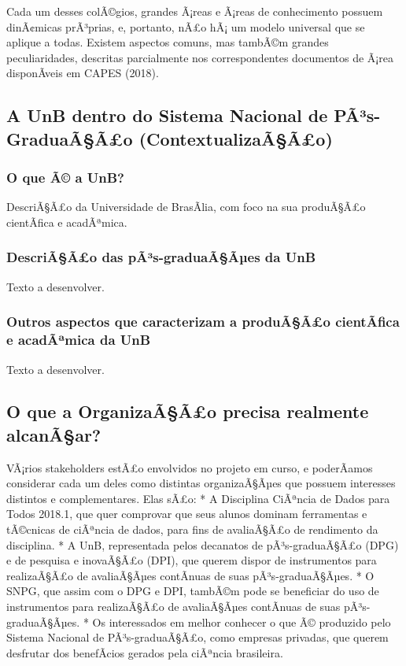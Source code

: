 \documentclass[]{article}
\begin{document}
Cada um desses colÃ©gios, grandes Ã¡reas e Ã¡reas de conhecimento
possuem dinÃ¢micas prÃ³prias, e, portanto, nÃ£o hÃ¡ um modelo universal
que se aplique a todas. Existem aspectos comuns, mas tambÃ©m grandes
peculiaridades, descritas parcialmente nos correspondentes documentos de
Ã¡rea disponÃ­veis em CAPES (2018).

\subsection{A UnB dentro do Sistema Nacional de PÃ³s-GraduaÃ§Ã£o
(ContextualizaÃ§Ã£o)}\label{a-unb-dentro-do-sistema-nacional-de-pas-graduaaao-contextualizaaao}

\subsubsection{O que Ã© a UnB?}\label{o-que-a-a-unb}

DescriÃ§Ã£o da Universidade de BrasÃ­lia, com foco na sua produÃ§Ã£o
cientÃ­fica e acadÃªmica.

\subsubsection{DescriÃ§Ã£o das pÃ³s-graduaÃ§Ãµes da
UnB}\label{descriaao-das-pas-graduaaaes-da-unb}

Texto a desenvolver.

\subsubsection{Outros aspectos que caracterizam a produÃ§Ã£o cientÃ­fica
e acadÃªmica da
UnB}\label{outros-aspectos-que-caracterizam-a-produaao-cientafica-e-acadamica-da-unb}

Texto a desenvolver.

\subsection{O que a OrganizaÃ§Ã£o precisa realmente
alcanÃ§ar?}\label{o-que-a-organizaaao-precisa-realmente-alcanaar}

VÃ¡rios stakeholders estÃ£o envolvidos no projeto em curso, e
poderÃ­amos considerar cada um deles como distintas organizaÃ§Ãµes que
possuem interesses distintos e complementares. Elas sÃ£o: * A Disciplina
CiÃªncia de Dados para Todos 2018.1, que quer comprovar que seus alunos
dominam ferramentas e tÃ©cnicas de ciÃªncia de dados, para fins de
avaliaÃ§Ã£o de rendimento da disciplina. * A UnB, representada pelos
decanatos de pÃ³s-graduaÃ§Ã£o (DPG) e de pesquisa e inovaÃ§Ã£o (DPI),
que querem dispor de instrumentos para realizaÃ§Ã£o de avaliaÃ§Ãµes
contÃ­nuas de suas pÃ³s-graduaÃ§Ãµes. * O SNPG, que assim com o DPG e
DPI, tambÃ©m pode se beneficiar do uso de instrumentos para realizaÃ§Ã£o
de avaliaÃ§Ãµes contÃ­nuas de suas pÃ³s-graduaÃ§Ãµes. * Os interessados
em melhor conhecer o que Ã© produzido pelo Sistema Nacional de
PÃ³s-graduaÃ§Ã£o, como empresas privadas, que querem desfrutar dos
benefÃ­cios gerados pela ciÃªncia brasileira.
\end{document}
